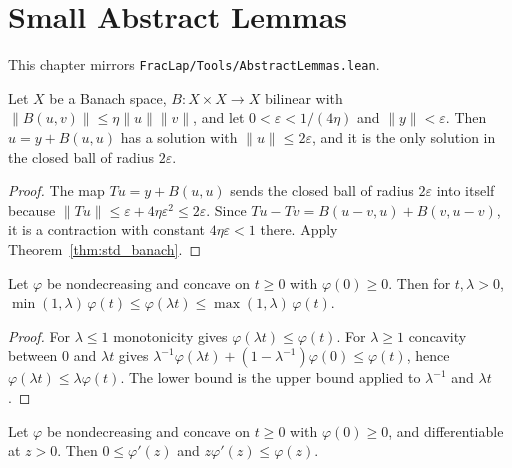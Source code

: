 \chapter{Small Abstract Lemmas}

This chapter mirrors \texttt{FracLap/Tools/AbstractLemmas.lean}.

\begin{theorem}\label{thm:bilinear_fixed_point}
\leanok
Let $X$ be a Banach space, $B : X \times X \to X$ bilinear with $\lVert B(u, v) \rVert \le \eta \lVert u \rVert \lVert v \rVert$, and let $0 < \varepsilon < 1/(4\eta)$ and $\lVert y \rVert < \varepsilon$. Then $u = y + B(u, u)$ has a solution with $\lVert u \rVert \le 2\varepsilon$, and it is the only solution in the closed ball of radius $2\varepsilon$.
\end{theorem}

\begin{proof}
\leanok
The map $T u = y + B(u, u)$ sends the closed ball of radius $2\varepsilon$ into itself because $\lVert T u \rVert \le \varepsilon + 4\eta\varepsilon^2 \le 2\varepsilon$. Since $T u - T v = B(u - v, u) + B(v, u - v)$, it is a contraction with constant $4\eta\varepsilon < 1$ there. Apply Theorem~\ref{thm:std_banach}.
\end{proof}

\begin{theorem}\label{thm:bernstein_scaling}
\leanok
Let $\varphi$ be nondecreasing and concave on $t \ge 0$ with $\varphi(0) \ge 0$. Then for $t, \lambda > 0$, $\min(1, \lambda)\, \varphi(t) \le \varphi(\lambda t) \le \max(1, \lambda)\, \varphi(t)$.
\end{theorem}

\begin{proof}
\leanok
For $\lambda \le 1$ monotonicity gives $\varphi(\lambda t) \le \varphi(t)$. For $\lambda \ge 1$ concavity between $0$ and $\lambda t$ gives $\lambda^{-1} \varphi(\lambda t) + (1 - \lambda^{-1}) \varphi(0) \le \varphi(t)$, hence $\varphi(\lambda t) \le \lambda \varphi(t)$. The lower bound is the upper bound applied to $\lambda^{-1}$ and $\lambda t$.
\end{proof}

\begin{theorem}\label{thm:bernstein_derivative}
\leanok
Let $\varphi$ be nondecreasing and concave on $t \ge 0$ with $\varphi(0) \ge 0$, and differentiable at $z > 0$. Then $0 \le \varphi'(z)$ and $z \varphi'(z) \le \varphi(z)$.
\end{theorem}

